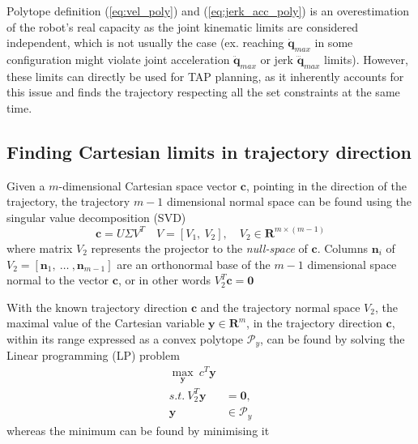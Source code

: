 Polytope definition (\ref{eq:vel_poly}) and (\ref{eq:jerk_acc_poly}) is an overestimation of the robot's real capacity as the joint kinematic limits are considered independent, which is not usually the case (ex. reaching $\dot{\bm{q}}_{max}$ in some configuration might violate joint acceleration $\ddot{\bm{q}}_{max}$  or jerk $\dddot{\bm{q}}_{max}$ limits). However, these limits can directly be used for TAP planning, as it inherently accounts for this issue and finds the trajectory respecting all the set constraints at the same time. 

\subsection{Finding Cartesian limits in trajectory direction}
\label{ch:capacity_lp}

Given a $m$-dimensional Cartesian space vector $\bm{c}$, pointing in the direction of the trajectory, the trajectory $m\!-\!1$ dimensional normal space can be found using the singular value decomposition (SVD)
\begin{equation}
    \bm{c} = U\Sigma V^T \quad V = \left[ V_1, ~ V_2\right], \quad V_2 \in \mathbf{R}^{m \times (m-1)}  
\end{equation}
where matrix $V_2$ represents the projector to the \textit{null-space} of $\bm{c}$\cite{klema_singular_1980}. Columns $\bm{n}_i$ of $V_2=\left[\bm{n}_1,~ \ldots~, \bm{n}_{m-1} \right]$ are an orthonormal base of the $m\!-\!1$ dimensional space normal to the vector $\bm{c}$, or in other words $V_2^T\bm{c} = \bm{0}$

With the known trajectory direction $\bm{c}$ and the trajectory normal space $V_2$, the maximal value of the Cartesian variable $\bm{y} \in\mathbf{R}^m$, in the trajectory direction $\bm{c}$, within its range expressed as a convex polytope $\mathcal{P}_y$, can be found by solving the Linear programming (LP) problem\cite{vajda_gass_1964}
\begin{equation}
\begin{split}
    \max_{\bm{y}} ~c^T \bm{y}& \\
    s.t. ~ V_2^T\bm{y} &= \bm{0}, \\
    \bm{y}&\in \mathcal{P}_y
\end{split}\label{eq:lp_general}
\end{equation}
whereas the minimum can be found by minimising it%

